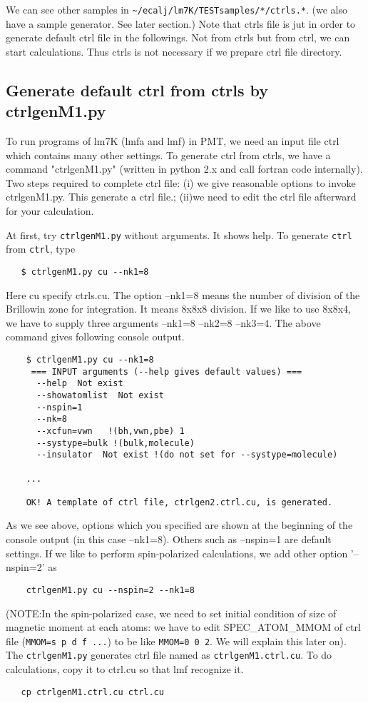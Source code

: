 \documentclass[a4paper,10pt,epsf,fleqn]{article}
\begin{document}
We can see other samples in \verb+~/ecalj/lm7K/TESTsamples/*/ctrls.*+.
(we also have a sample generator. See later section.)
Note that ctrls file is jut in order to generate default ctrl file in
the followings. Not from ctrls but from ctrl, we can start calculations.
Thus ctrls is not necessary if we prepare ctrl file directory.


\subsection{Generate default ctrl from ctrls by ctrlgenM1.py}
To run programs of lm7K (lmfa and lmf) in PMT,
we need an input file ctrl which contains many other settings.
To generate ctrl from ctrls, we have a command "ctrlgenM1.py" (written
in python 2.x and call fortran code internally).
Two steps required to complete ctrl file:
(i) we give reasonable options to invoke ctrlgenM1.py. 
This generate a ctrl file.;
(ii)we need to edit the ctrl file afterward for your calculation.

At first, try \verb+ctrlgenM1.py+ without arguments. It shows help. 
To generate \verb+ctrl+ from \verb+ctrl+, type
\begin{verbatim}
   $ ctrlgenM1.py cu --nk1=8
\end{verbatim}
Here cu specify ctrls.cu. The option --nk1=8 
means the number of division of the Brillowin zone for
integration. It means 8x8x8 division. If we like to use 8x8x4, 
we have to supply three arguments --nk1=8 --nk2=8 --nk3=4.
The above command gives following console output.
\begin{verbatim}
    $ ctrlgenM1.py cu --nk1=8
     === INPUT arguments (--help gives default values) === 
      --help  Not exist
      --showatomlist  Not exist
      --nspin=1
      --nk=8
      --xcfun=vwn   !(bh,vwn,pbe) 1
      --systype=bulk !(bulk,molecule)
      --insulator  Not exist !(do not set for --systype=molecule)

    ...

    OK! A template of ctrl file, ctrlgen2.ctrl.cu, is generated.
\end{verbatim}
As we see above, 
options which you specified are shown at the beginning of the console output
(in this case --nk1=8). Others such as --nspin=1 are default settings.
If we like to perform spin-polarized calculations, we add other option
'--nspin=2' as
\begin{verbatim}
    ctrlgenM1.py cu --nspin=2 --nk1=8
\end{verbatim}
(NOTE:In the spin-polarized case, we need to set initial condition of size of
magnetic moment at each atoms: we have to edit
SPEC\_ATOM\_MMOM of ctrl file (\verb+MMOM=s p d f ...+) to be like
\verb+MMOM=0 0 2+. We will explain this later on).
The \verb+ctrlgenM1.py+ generates ctrl file named as
\verb+ctrlgenM1.ctrl.cu+. To do calculations, copy it to ctrl.cu so 
that lmf recognize it.
\begin{verbatim}
   cp ctrlgenM1.ctrl.cu ctrl.cu
\end{verbatim}
\end{document}

